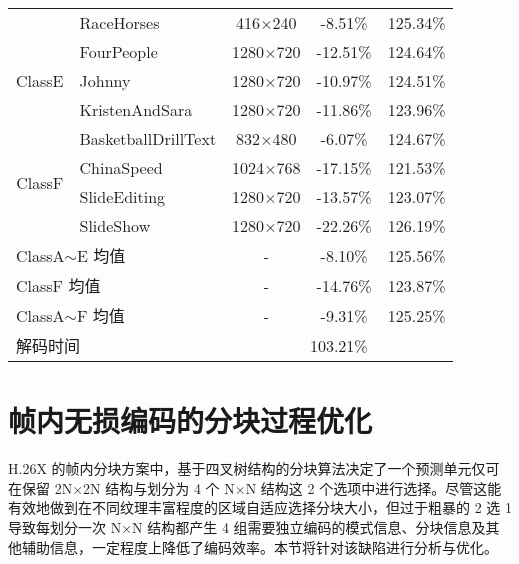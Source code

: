 \begin{table}[!p]
\begin{tabular}{@{}clccc@{}}
                                               & RaceHorses                   & 416$\times$240   & -8.51\%  & 125.34\% \\
        \multirow{3}{*}{ClassE}                & FourPeople                   & 1280$\times$720  & -12.51\% & 124.64\% \\
                                               & Johnny                       & 1280$\times$720  & -10.97\% & 124.51\% \\
                                               & KristenAndSara               & 1280$\times$720  & -11.86\% & 123.96\% \\
        \multirow{4}{*}{ClassF}                & BasketballDrillText          & 832$\times$480   & -6.07\%  & 124.67\% \\
                                               & ChinaSpeed                   & 1024$\times$768  & -17.15\% & 121.53\% \\
                                               & SlideEditing                 & 1280$\times$720  & -13.57\% & 123.07\% \\
                                               & SlideShow                    & 1280$\times$720  & -22.26\% & 126.19\% \\ \midrule
        \multicolumn{2}{l}{ClassA$\sim$E 均值} & -                            & -8.10\%          & 125.56\%            \\ \midrule
        \multicolumn{2}{l}{ClassF 均值}        & -                            & -14.76\%         & 123.87\%            \\ \midrule
        \multicolumn{2}{l}{ClassA$\sim$F 均值} & -                            & -9.31\%          & 125.25\%            \\ \midrule
        \multicolumn{2}{l}{解码时间}           & \multicolumn{3}{c}{103.21\%}                                          \\ \bottomrule
    \end{tabular}
\end{table}

\section{帧内无损编码的分块过程优化}
H.26X 的帧内分块方案中，基于四叉树结构的分块算法决定了一个预测单元仅可在保留 2N$\times$2N 结构与划分为 4 个 N$\times$N 结构这 2 个选项中进行选择。尽管这能有效地做到在不同纹理丰富程度的区域自适应选择分块大小，但过于粗暴的 2 选 1 导致每划分一次 N$\times$N 结构都产生 4 组需要独立编码的模式信息、分块信息及其他辅助信息，一定程度上降低了编码效率。本节将针对该缺陷进行分析与优化。

